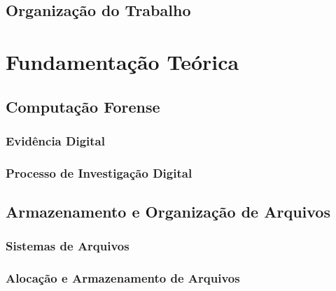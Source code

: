 \documentclass[cic,diss,portuguese]{infufrgs}
\begin{document}
\section{Organização do Trabalho}
 






\chapter{Fundamentação Teórica}




\section{Computação Forense}

\subsection{Evidência Digital}

\subsection{Processo de Investigação Digital}

\section{Armazenamento e Organização de Arquivos}

\subsection{Sistemas de Arquivos}

\subsection{Alocação e Armazenamento de Arquivos}
\end{document}
